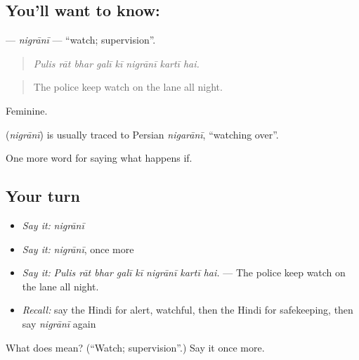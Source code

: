 \subsection*{You'll want to know: }
\textbf{} — \emph{nigrānī} — \textquotedblleft{}watch; supervision\textquotedblright{}.

\begin{quote}
       
\end{quote}

\begin{quote}
\emph{Pulis rāt bhar galī kī nigrānī kartī hai.}
\end{quote}

\begin{quote}
The police keep watch on the lane all night.
\end{quote}

Feminine.

\begin{cousinweb}
\textbf{} (\emph{nigrānī}) is usually traced to Persian \emph{nigarānī}, \textquotedblleft{}watching over\textquotedblright{}.
\end{cousinweb}

\begin{grammarlens}[title={What you've built}]
One more word for saying what happens if.
\end{grammarlens}

\subsection*{Your turn}
\begin{itemize}
\raggedright
  \item \emph{Say it:} \emph{nigrānī}
  \item \emph{Say it:} \emph{nigrānī}, once more
  \item \emph{Say it:} \emph{Pulis rāt bhar galī kī nigrānī kartī hai.} — The police keep watch on the lane all night.
  \item \emph{Recall:} say the Hindi for alert, watchful, then the Hindi for safekeeping, then say \emph{nigrānī} again
\end{itemize}

\begin{tcolorbox}[breakable,colback=teal!4,colframe=teal!35!black,title={Before you move on}]
What does  mean? (\textquotedblleft{}Watch; supervision\textquotedblright{}.) Say it once more.
\end{tcolorbox}
